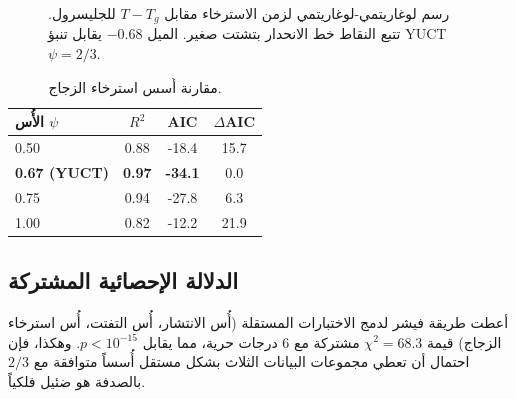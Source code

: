\documentclass[11pt,a4paper]{article}
\begin{document}
	\begin{otherlanguage}{english}
		\begin{figure}[htbp]
			\centering
			\caption{رسم لوغاريتمي-لوغاريتمي لزمن الاسترخاء مقابل \(T - T_g\) للجليسرول. تتبع النقاط خط الانحدار بتشتت صغير. الميل \(-0.68\) يقابل تنبؤ YUCT \(\psi = 2/3\).}
			\label{fig:glass}
		\end{figure}
		
		\begin{table}[htbp]
			\centering
			\caption{مقارنة أُسس استرخاء الزجاج.}
			\label{tab:glass}
			\begin{tabular}{lccc}
				\toprule
				الأُس \(\psi\) & \(R^2\) & AIC & \(\Delta\)AIC \\
				\midrule
				0.50 & 0.88 & -18.4 & 15.7 \\
				\textbf{0.67 (YUCT)} & \textbf{0.97} & \textbf{-34.1} & 0.0 \\
				0.75 & 0.94 & -27.8 & 6.3 \\
				1.00 & 0.82 & -12.2 & 21.9 \\
				\bottomrule
			\end{tabular}
		\end{table}
	\end{otherlanguage}
	
	\subsection{الدلالة الإحصائية المشتركة}
	أعطت طريقة فيشر لدمج الاختبارات المستقلة (أُس الانتشار، أُس التفتت، أُس استرخاء الزجاج) قيمة \(\chi^2 = 68.3\) مشتركة مع 6 درجات حرية، مما يقابل \(p < 10^{-15}\). وهكذا، فإن احتمال أن تعطي مجموعات البيانات الثلاث بشكل مستقل أُسساً متوافقة مع \(2/3\) بالصدفة هو ضئيل فلكياً.
	
\end{document}
